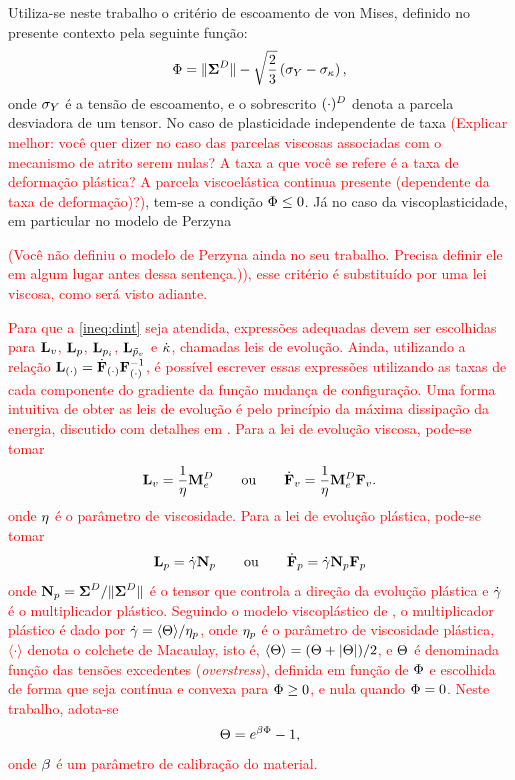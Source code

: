 \documentclass[Tese.tex]{subfiles}
\begin{document}
Utiliza-se neste trabalho o critério de escoamento de von Mises, definido no presente contexto pela seguinte função:
\begin{equation}\label{eq:yield}
\Phi = \|\boldsymbol{\Sigma}^D\| - \sqrt{\dfrac{2}{3}}\left(\sigma_Y - \sigma_{\kappa}\right),
\end{equation}
onde $\sigma_Y$ é a tensão de escoamento, e o sobrescrito $(\cdot)^D$ denota a parcela desviadora de um tensor. No caso de plasticidade independente de taxa \textcolor{red}{(Explicar melhor: você quer dizer no caso das parcelas viscosas associadas com o mecanismo de atrito serem nulas? A taxa a que você se refere é a taxa de deformação plástica? A parcela viscoelástica continua presente (dependente da taxa de deformação)?)}, tem-se a condição $\Phi \leq 0$. Já no caso da viscoplasticidade, em particular no modelo de Perzyna \textcolor{red}{(Você não definiu o modelo de Perzyna ainda no seu trabalho. Precisa definir ele em algum lugar antes dessa sentença.)), esse critério é substituído por uma lei viscosa, como será visto adiante.

Para que a \cref{ineq:dint} seja atendida, expressões adequadas devem ser escolhidas para $\mathbf{L}_v$, $\mathbf{L}_p$, $\mathbf{L}_{p_i}$, $\mathbf{L}_{\tilde{p}_v}$ e $\dot{\kappa}$, chamadas leis de evolução. Ainda, utilizando a relação $\mathbf{L}_{(\cdot)} = \dot{\mathbf{F}}_{(\cdot)}\mathbf{F}_{(\cdot)}^{-1}$, é possível escrever essas expressões utilizando as taxas de cada componente do gradiente da função mudança de configuração. Uma forma intuitiva de obter as leis de evolução é pelo princípio da máxima dissipação da energia, discutido com detalhes em . Para a lei de evolução viscosa, pode-se tomar
\begin{equation}
	\mathbf{L}_v = \dfrac{1}{\eta}\mathbf{M}_e^D \qquad\text{ou}\qquad \dot{\mathbf{F}}_v = \dfrac{1}{\eta}\mathbf{M}_e^D\mathbf{F}_v. \label{eq:Lv-evol}
\end{equation}
onde $\eta$ é o parâmetro de viscosidade. Para a lei de evolução plástica, pode-se tomar
\begin{equation}
\mathbf{L}_p = \dot{\gamma}\mathbf{N}_p  \qquad\text{ou}\qquad \dot{\mathbf{F}}_p = \dot{\gamma}\mathbf{N}_p\mathbf{F}_p \label{eq:Lp-evol}
\end{equation}
onde $\mathbf{N}_p = {\boldsymbol{\Sigma}^D}/{\|\boldsymbol{\Sigma}^D\|}$ é o tensor que controla a direção da evolução plástica e $\dot{\gamma}$ é o multiplicador plástico. Seguindo o modelo viscoplástico de , o multiplicador plástico é dado por $\dot{\gamma} = {\langle\Theta\rangle}/{\eta_{p}}$, onde $\eta_{p}$ é o parâmetro de viscosidade plástica, $\langle\cdot\rangle$ denota o colchete de Macaulay, isto é, $\langle\Theta\rangle = (\Theta + |\Theta|)/2$, e $\Theta$ é denominada função das tensões excedentes (\emph{overstress}), definida em função de $\Phi$ e escolhida de forma que seja contínua e convexa para $\Phi\geq 0$, e nula quando $\Phi = 0$. Neste trabalho, adota-se
\begin{equation}
\Theta = e^{\beta\Phi}-1,
\end{equation}
onde $\beta$ é um parâmetro de calibração do material. 

}
\end{document}
